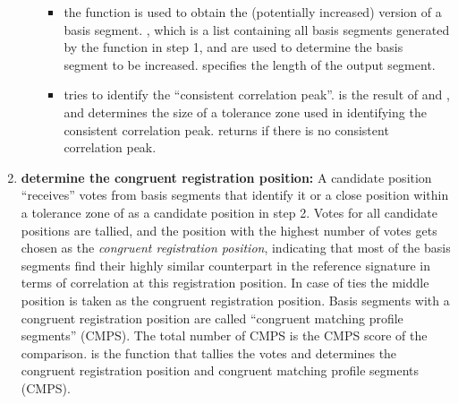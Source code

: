 \begin{enumerate}
\begin{itemize}
    \begin{itemize}
    \tightlist
    \item
      the function 
      is used to obtain the (potentially increased) version of a basis
      segment. , which is a list containing all basis
      segments generated by the function  in step
      1, and  are used to determine the basis segment to be
      increased.  specifies the length of the output
      segment.
    \item
       tries to identify the
      ``consistent correlation peak''.  is the result of
       and , and 
      determines the size of a tolerance zone used in identifying the
      consistent correlation peak.  returns
       if there is no consistent correlation peak.
    \end{itemize}
  \end{itemize}
\item
  \textbf{determine the congruent registration position:} A candidate
  position ``receives'' votes from basis segments that identify it or a
  close position within a tolerance zone of  as a candidate
  position in step 2. Votes for all candidate positions are tallied, and
  the position with the highest number of votes gets chosen as the
  \emph{congruent registration position}, indicating that most of the
  basis segments find their highly similar counterpart in the reference
  signature in terms of correlation at this registration position. In
  case of ties the middle position is taken as the congruent
  registration position. Basis segments with a congruent registration
  position are called ``congruent matching profile segments'' (CMPS).
  The total number of CMPS is the CMPS score of the comparison.
   is the function that tallies the
  votes and determines the congruent registration position and congruent
  matching profile segments (CMPS).
\end{enumerate}

